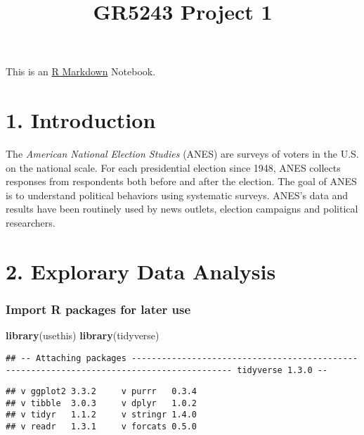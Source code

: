 \documentclass[
]{article}
\title{GR5243 Project 1}
\author{}
\date{\vspace{-2.5em}}
\newenvironment{Shaded}{\begin{snugshade}}{\end{snugshade}}
\newcommand{\KeywordTok}[1]{\textcolor[rgb]{0.13,0.29,0.53}{\textbf{#1}}}
\newcommand{\NormalTok}[1]{#1}
\begin{document}
\maketitle

This is an \href{http://rmarkdown.rstudio.com}{R Markdown} Notebook.

\hypertarget{introduction}{%
\section{1. Introduction}\label{introduction}}

The \emph{American National Election Studies} (ANES) are surveys of
voters in the U.S. on the national scale. For each presidential election
since 1948, ANES collects responses from respondents both before and
after the election. The goal of ANES is to understand political
behaviors using systematic surveys. ANES's data and results have been
routinely used by news outlets, election campaigns and political
researchers.

\hypertarget{explorary-data-analysis}{%
\section{2. Explorary Data Analysis}\label{explorary-data-analysis}}

\hypertarget{import-r-packages-for-later-use}{%
\subsubsection{Import R packages for later
use}\label{import-r-packages-for-later-use}}

\begin{Shaded}
\begin{Highlighting}[]
\KeywordTok{library}\NormalTok{(usethis)}
\KeywordTok{library}\NormalTok{(tidyverse)}
\end{Highlighting}
\end{Shaded}

\begin{verbatim}
## -- Attaching packages ------------------------------------------------------------------------------------------ tidyverse 1.3.0 --
\end{verbatim}

\begin{verbatim}
## v ggplot2 3.3.2     v purrr   0.3.4
## v tibble  3.0.3     v dplyr   1.0.2
## v tidyr   1.1.2     v stringr 1.4.0
## v readr   1.3.1     v forcats 0.5.0
\end{verbatim}
\end{document}
